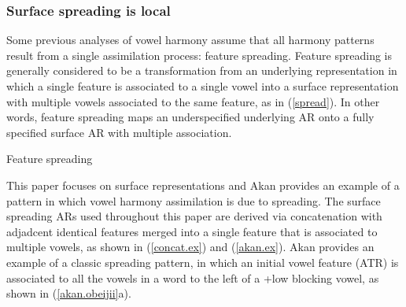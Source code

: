 \documentclass[,doc,floatsintext]{apa6}
\theoremstyle{definition}
\theoremstyle{definition}
\theoremstyle{definition}
\theoremstyle{remark}
\begin{document}
\subsubsection{Surface spreading is
local}\label{surface-spreading-is-local}

Some previous analyses of vowel harmony assume that all harmony patterns
result from a single assimilation process: feature spreading. Feature
spreading is generally considered to be a transformation from an
underlying representation in which a single feature is associated to a
single vowel into a surface representation with multiple vowels
associated to the same feature, as in (\ref{spread}). In other words,
feature spreading maps an underspecified underlying AR onto a fully
specified surface AR with multiple association.

\begin{exe}
\ex Feature spreading \label{spread} \\
\end{exe}

This paper focuses on surface representations and Akan provides an
example of a pattern in which vowel harmony assimilation is due to
spreading. The surface spreading ARs used throughout this paper are
derived via concatenation with adjadcent identical features merged into
a single feature that is associated to multiple vowels, as shown in
(\ref{concat.ex}) and (\ref{akan.ex}). Akan provides an example of a
classic spreading pattern, in which an initial vowel feature (ATR) is
associated to all the vowels in a word to the left of a +low blocking
vowel, as shown in (\ref{akan.obeijii}a).
\end{document}

